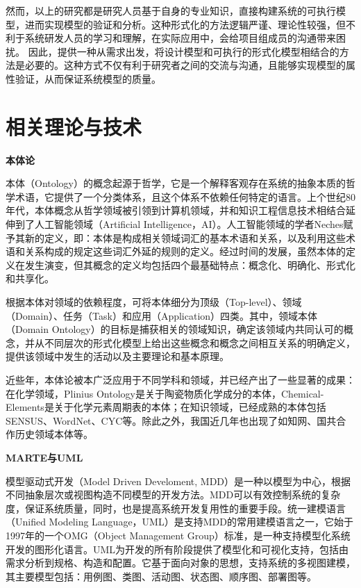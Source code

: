 	然而，以上的研究都是研究人员基于自身的专业知识，直接构建系统的可执行模型，进而实现模型的验证和分析。这种形式化的方法逻辑严谨、理论性较强，但不利于系统研发人员的学习和理解，在实际应用中，会给项目组成员的沟通带来困扰。
	因此，提供一种从需求出发，将设计模型和可执行的形式化模型相结合的方法是必要的。这种方式不仅有利于研究者之间的交流与沟通，且能够实现模型的属性验证，从而保证系统模型的质量。
	
\section{相关理论与技术}
	\textbf{本体论}

	本体（Ontology）的概念起源于哲学，它是一个解释客观存在系统的抽象本质的哲学术语，它提供了一个分类体系，且这个体系不依赖任何特定的语言。上个世纪80年代，本体概念从哲学领域被引领到计算机领域，并和知识工程信息技术相结合延伸到了人工智能领域（Artificial Intelligence，AI）\citep{王向前2016本体研究综述}。人工智能领域的学者Neches赋予其新的定义，即：本体是构成相关领域词汇的基本术语和关系，以及利用这些术语和关系构成的规定这些词汇外延的规则的定义。经过时间的发展，虽然本体的定义在发生演变，但其概念的定义均包括四个最基础特点：概念化、明确化、形式化和共享化。

	根据本体对领域的依赖程度，可将本体细分为顶级（Top-level）、领域（Domain）、任务（Task）和应用（Application）四类。其中，领域本体（Domain Ontology）的目标是捕获相关的领域知识，确定该领域内共同认可的概念，并从不同层次的形式化模型上给出这些概念和概念之间相互关系的明确定义，提供该领域中发生的活动以及主要理论和基本原理。
	
	近些年，本体论被本广泛应用于不同学科和领域，并已经产出了一些显著的成果：在化学领域，Plinius Ontology\citep{Vet1994The}是关于陶瓷物质化学成分的本体，Chemical-Elements\citep{L1999Building}是关于化学元素周期表的本体；在知识领域，已经成熟的本体包括SENSUS\citep{Cranor2002Sensus}、WordNet\citep{Fellbaum1998WordNet}、CYC\citep{Cranor2002Sensus}等。除此之外，我国近几年也出现了如知网、国共合作历史领域本体等。
	
\textbf{MARTE与UML}

	模型驱动式开发（Model Driven Develoment, MDD）是一种以模型为中心，根据不同抽象层次或视图构造不同模型的开发方法。MDD可以有效控制系统的复杂度，保证系统质量，同时，也是提高系统开发复用性的重要手段。统一建模语言（Unified Modeling Language，UML）\citep{博什2001UML}是支持MDD的常用建模语言之一，它始于1997年的一个OMG（Object Management Group）标准，是一种支持模型化系统开发的图形化语言。UML为开发的所有阶段提供了模型化和可视化支持，包括由需求分析到规格、构造和配置。它基于面向对象的思想，支持系统的多视图建模，其主要模型包括：用例图、类图、活动图、状态图、顺序图、部署图等。
	
